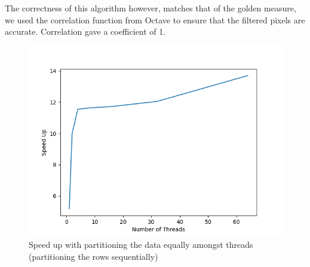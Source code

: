The correctness of this algorithm however, matches that of the golden measure, we used the
correlation function from Octave to ensure that the filtered pixels are accurate. Correlation gave
a coefficient of 1.
\begin{figure}[!h]
  \includegraphics[width=\linewidth]{Figures/speedup.png}
  \caption{Speed up with partitioning the data equally amongst threads (partitioning the rows sequentially)}
  \label{fig:boat3}
\end{figure}


